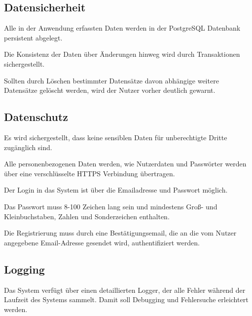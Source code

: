 \subsection{Datensicherheit}

\begin{description}
	 Alle in der Anwendung erfassten Daten werden in der PostgreSQL Datenbank persistent abgelegt.

	 Die Konsistenz der Daten über Änderungen hinweg wird durch Transaktionen sichergestellt.

	 Sollten durch Löschen bestimmter Datensätze davon abhängige weitere Datensätze gelöscht werden, wird der Nutzer vorher deutlich gewarnt.
\end{description}

\subsection{Datenschutz}

\begin{description}
	 Es wird sichergestellt, dass keine sensiblen Daten für unberechtigte Dritte zugänglich sind.

	 Alle personenbezogenen Daten werden, wie Nutzerdaten und Passwörter werden über eine verschlüsselte HTTPS Verbindung übertragen.

	 Der Login in das System ist über die Emailadresse und Passwort möglich.

	 Das Passwort muss 8-100 Zeichen lang sein und mindestens Groß- und Kleinbuchstaben, Zahlen und Sonderzeichen enthalten.

	 Die Registrierung muss durch eine Bestätigungsemail, die an die vom Nutzer angegebene Email-Adresse gesendet wird, authentifiziert werden.
\end{description}

\subsection{Logging}

\begin{description}
	 Das System verfügt über einen detaillierten Logger, der alle Fehler während der Laufzeit des Systems sammelt. Damit soll Debugging und Fehlersuche erleichtert werden.
\end{description}

